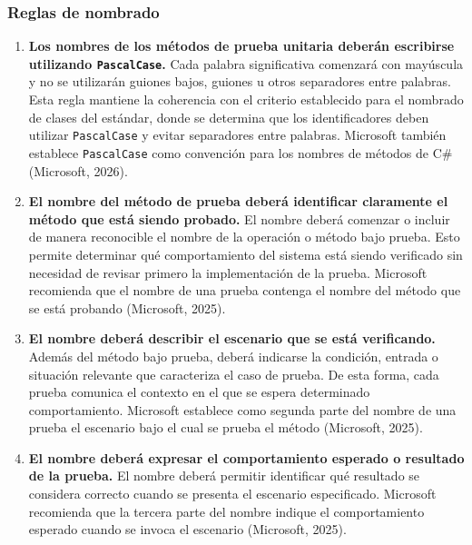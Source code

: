 
\subsubsection{Reglas de nombrado}

\begin{enumerate}

\item \textbf{Los nombres de los métodos de prueba unitaria deberán escribirse utilizando \texttt{PascalCase}.} Cada palabra significativa comenzará con mayúscula y no se utilizarán guiones bajos, guiones u otros separadores entre palabras. Esta regla mantiene la coherencia con el criterio establecido para el nombrado de clases del estándar, donde se determina que los identificadores deben utilizar \texttt{PascalCase} y evitar separadores entre palabras. Microsoft también establece \texttt{PascalCase} como convención para los nombres de métodos de C\# (Microsoft, 2026).

\item \textbf{El nombre del método de prueba deberá identificar claramente el método que está siendo probado.} El nombre deberá comenzar o incluir de manera reconocible el nombre de la operación o método bajo prueba. Esto permite determinar qué comportamiento del sistema está siendo verificado sin necesidad de revisar primero la implementación de la prueba. Microsoft recomienda que el nombre de una prueba contenga el nombre del método que se está probando (Microsoft, 2025).

\item \textbf{El nombre deberá describir el escenario que se está verificando.} Además del método bajo prueba, deberá indicarse la condición, entrada o situación relevante que caracteriza el caso de prueba. De esta forma, cada prueba comunica el contexto en el que se espera determinado comportamiento. Microsoft establece como segunda parte del nombre de una prueba el escenario bajo el cual se prueba el método (Microsoft, 2025).

\item \textbf{El nombre deberá expresar el comportamiento esperado o resultado de la prueba.} El nombre deberá permitir identificar qué resultado se considera correcto cuando se presenta el escenario especificado. Microsoft recomienda que la tercera parte del nombre indique el comportamiento esperado cuando se invoca el escenario (Microsoft, 2025).


\end{enumerate}
